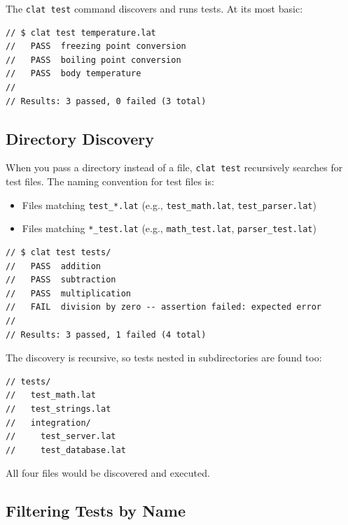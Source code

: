 The \lstinline|clat test| command discovers and runs tests.
At its most basic:

\begin{lstlisting}[language=Lattice, caption={Running tests in a single file}]
// $ clat test temperature.lat
//   PASS  freezing point conversion
//   PASS  boiling point conversion
//   PASS  body temperature
//
// Results: 3 passed, 0 failed (3 total)
\end{lstlisting}

\subsection{Directory Discovery}\label{sec:test-discovery}

When you pass a directory instead of a file, \lstinline|clat test| recursively searches for test files.
The naming convention for test files is:

\begin{itemize}
  \item Files matching \lstinline|test_*.lat| (e.g., \lstinline|test_math.lat|, \lstinline|test_parser.lat|)
  \item Files matching \lstinline|*_test.lat| (e.g., \lstinline|math_test.lat|, \lstinline|parser_test.lat|)
\end{itemize}

\begin{lstlisting}[language=Lattice, caption={Running all tests in a directory}]
// $ clat test tests/
//   PASS  addition
//   PASS  subtraction
//   PASS  multiplication
//   FAIL  division by zero -- assertion failed: expected error
//
// Results: 3 passed, 1 failed (4 total)
\end{lstlisting}

The discovery is recursive, so tests nested in subdirectories are found too:

\begin{lstlisting}[language=Lattice, caption={Typical test directory layout}]
// tests/
//   test_math.lat
//   test_strings.lat
//   integration/
//     test_server.lat
//     test_database.lat
\end{lstlisting}

All four files would be discovered and executed.

\subsection{Filtering Tests by Name}\label{sec:test-filter}

